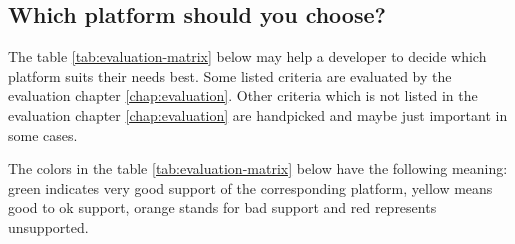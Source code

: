 \subsection*{Which platform should you choose?}\label{subsec:which-platform}
The table \ref{tab:evaluation-matrix} below may help a developer to decide which platform suits their needs best. Some listed criteria are evaluated by the evaluation chapter \ref{chap:evaluation}. Other criteria which is not listed in the evaluation chapter \ref{chap:evaluation} are handpicked and maybe just important in some cases.


\bigskip
The colors in the table \ref{tab:evaluation-matrix} below have the following meaning: green indicates very good support of the corresponding platform, yellow means good to ok support, orange stands for bad support and red represents unsupported.

